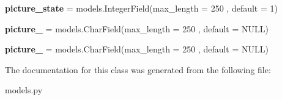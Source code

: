 \begin{DoxyCompactItemize}
{\bfseries picture\+\_\+state} = models.\+Integer\+Field(max\+\_\+length = 250 , default = 1)
\item 
\mbox{\label{classmessengerbot_1_1models_1_1order_acc10f001e574003ae4617a3cd00d2e9f}} 
{\bfseries picture\+\_} = models.\+Char\+Field(max\+\_\+length = 250 , default = \textquotesingle{}N\+U\+LL\textquotesingle{})
\item 
\mbox{\label{classmessengerbot_1_1models_1_1order_a385906e5e952802d4faa7eb82edbd0dd}} 
{\bfseries picture\+\_} = models.\+Char\+Field(max\+\_\+length = 250 , default = \textquotesingle{}N\+U\+LL\textquotesingle{})
\end{DoxyCompactItemize}


The documentation for this class was generated from the following file\+:\begin{DoxyCompactItemize}
\item 
models.\+py\end{DoxyCompactItemize}
